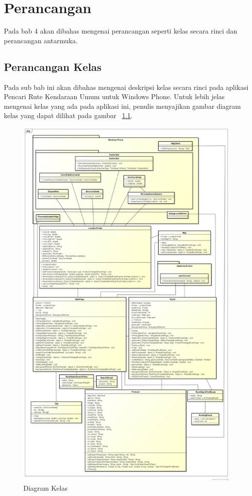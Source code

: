 \chapter{Perancangan}
\label{chap:Perancangan}

Pada bab 4 akan dibahas mengenai perancangan seperti kelas secara rinci dan perancangan antarmuka.

\section{Perancangan Kelas}
\label{lab:Perancangan Kelas}
\hspace{0.5cm} Pada sub bab ini akan dibahas mengenai deskripsi kelas secara rinci pada aplikasi Pencari Rute Kendaraan Umum untuk Windows Phone. Untuk lebih jelas mengenai kelas yang ada pada aplikasi ini, penulis menyajikan gambar diagram kelas yang dapat dilihat pada  gambar ~\ref{fig:kelas}. 

\begin{figure}[h]
	\centering
		\includegraphics[scale=0.2]{Gambar/useCase_dan_Class/class4}
	\caption{Diagram Kelas}
	\label{fig:kelas}
\end{figure}

